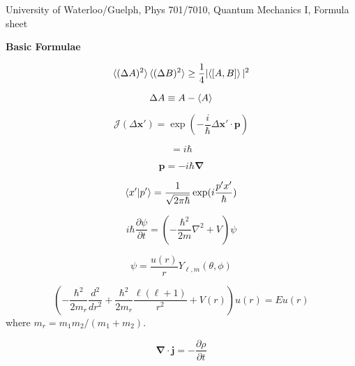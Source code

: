 \documentclass[11pt]{article}
\newcommand{\CurJ}{\mathcal{J}}
\newcommand{\vect}[1]{\boldsymbol{\mathbf{#1}}}
\begin{document}
\begin{center}
{\large University of Waterloo/Guelph, Phys 701/7010, Quantum Mechanics I, Formula sheet}
\end{center}

\begin{multicols}{2}

{\bf Basic Formulae}

\begin{equation} %
\braket{(\Delta A)^2} \braket{(\Delta B)^2}
  \ge \frac{1}{4} |\!\braket{[A,B]}|^2
\end{equation}

\begin{equation}
\Delta A \equiv A - \braket{A}
\end{equation}

\begin{equation}
\CurJ (\Delta \vect{x}') = \exp \left (-\frac{i}{\hbar} \Delta \vect{x}' \cdot \vect{p} \right)
\end{equation}

\begin{equation}
[\,x,p\,] = i\hbar
\end{equation}

\begin{equation}
\vect{p} = -i \hbar \vect{\nabla}
\end{equation}

\begin{equation}
\braket{x'|p'} = \frac{1}{\sqrt{2\pi\hbar}} \exp (i\frac{p'x'}{\hbar})
\end{equation}

\begin{equation}
i\hbar \frac{\partial \psi}{\partial t} = (-\frac{\hbar^2}{2m} \nabla^2 + V) \psi
\end{equation}

\begin{equation}
\psi = \frac{u(r)}{r} Y_{\ell,m}(\theta,\phi)
\end{equation}

\begin{equation}
\left(
  -\frac{\hbar^2}{2m_r} \frac{d^2}{d r^2}
  + \frac{\hbar^2}{2m_r} \frac{\ell (\ell+1)}{r^2}
  + V(r)
\right) u(r) = E u(r)
\end{equation}
where $m_r = m_1 m_2 / (m_1 + m_2)$.

\begin{equation}
\vect{\nabla} \cdot \vect{j} = - \frac{\partial \rho}{\partial t}
\end{equation}


\end{multicols}
\end{document}
